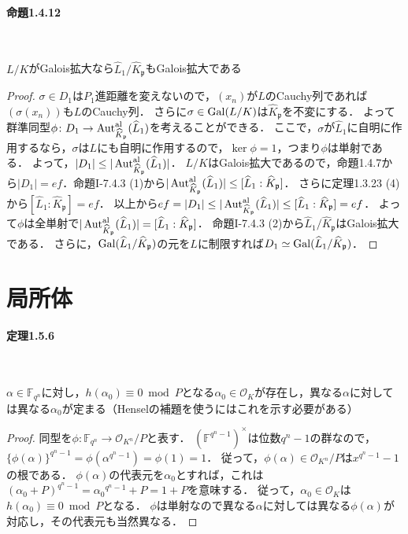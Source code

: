 \paragraph{命題1.4.12}~
\begin{screen}
  $L/K$がGalois拡大なら$\widehat{L}_1/\widehat{K}_\mathfrak{p}$もGalois拡大である
\end{screen}
\begin{proof}
  $\sigma\in D_1$は$P_1$進距離を変えないので，$(x_n)$が$L$のCauchy列であれば$(\sigma(x_n))$も$L$のCauchy列．
  さらに$\sigma\in\operatorname{Gal}(L/K)$は$\widehat{K}_\mathfrak{p}$を不変にする．
  よって群準同型$\phi\colon D_1\to\operatorname{Aut}_{\widehat{K}_\mathfrak{p}}^\text{al}(\widehat{L}_1)$を考えることができる．
  ここで，$\sigma$が$\widehat{L}_1$に自明に作用するなら，$\sigma$は$L$にも自明に作用するので，$\ker\phi = 1$，つまり$\phi$は単射である．
  よって，$|D_1|\leq|\operatorname{Aut}_{\widehat{K}_\mathfrak{p}}^\text{al}(\widehat{L}_1)|$．
  $L/K$はGalois拡大であるので，命題1.4.7から$|D_1| = ef$．命題I-7.4.3 (1)から$|\operatorname{Aut}_{\widehat{K}_\mathfrak{p}}^\text{al}(\widehat{L}_1)|\leq[\widehat{L}_1:\widehat{K}_\mathfrak{p}]$．
  さらに定理1.3.23 (4)から$[\widehat{L}_1:\widehat{K}_\mathfrak{p}] = ef$．
  以上から$ef = |D_1|\leq|\operatorname{Aut}_{\widehat{K}_\mathfrak{p}}^\text{al}(\widehat{L}_1)|\leq[\widehat{L}_1:\widehat{K}_\mathfrak{p}] = ef$．
  よって$\phi$は全単射で$|\operatorname{Aut}_{\widehat{K}_\mathfrak{p}}^\text{al}(\widehat{L}_1)| = [\widehat{L}_1:\widehat{K}_\mathfrak{p}]$．
  命題I-7.4.3 (2)から$\widehat{L}_1/\widehat{K}_\mathfrak{p}$はGalois拡大である．
  さらに，$\operatorname{Gal}(\widehat{L}_1/\widehat{K}_\mathfrak{p})$の元を$L$に制限すれば$D_1\simeq\operatorname{Gal}(\widehat{L}_1/\widehat{K}_\mathfrak{p})$．
\end{proof}

\section{局所体}
\paragraph{定理1.5.6}~
\begin{screen}
  $\alpha\in\mathbb{F}_{q^n}$に対し，$h(\alpha_0)\equiv0\bmod P$となる$ \alpha_0\in\mathcal{O}_K$が存在し，異なる$\alpha$に対しては異なる$\alpha_0$が定まる（Henselの補題を使うにはこれを示す必要がある）
\end{screen}
\begin{proof}
  同型を$\phi\colon\mathbb{F}_{q^n}\to\mathcal{O}_{K^n}/P$と表す．
  $(\mathbb{F}^{q^n-1})^\times$は位数$q^n-1$の群なので，$\{\phi(\alpha)\}^{q^n-1} = \phi(\alpha^{q^n-1}) = \phi(1) = 1$．
  従って，$\phi(\alpha)\in\mathcal{O}_{K^n}/P$は$x^{q^n-1}-1$の根である．
  $\phi(\alpha)$の代表元を$\alpha_0$とすれば，これは$(\alpha_0 + P)^{q^n-1} = \alpha_0{}^{q^n-1} + P = 1 + P$を意味する．
  従って，$\alpha_0\in\mathcal{O}_K$は$h(\alpha_0)\equiv0\bmod P$となる．
  $\phi$は単射なので異なる$\alpha$に対しては異なる$\phi(\alpha)$が対応し，その代表元も当然異なる．
\end{proof}

